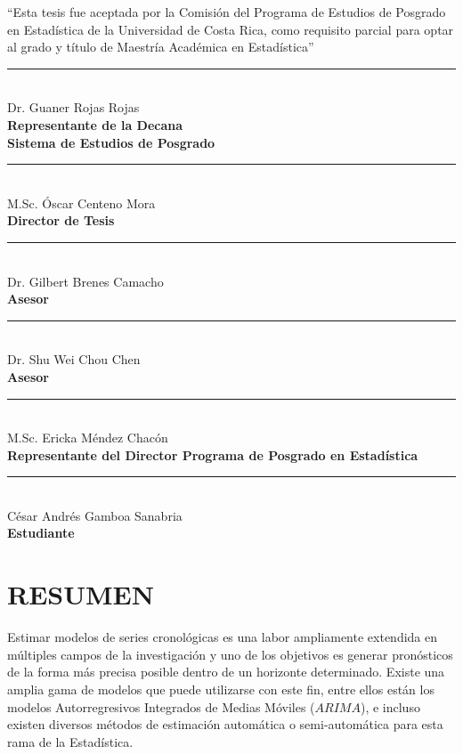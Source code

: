 \documentclass[
]{article}
\begin{document}
\begin{center}

``Esta tesis fue aceptada por la Comisión del Programa de Estudios de Posgrado en Estadística de la Universidad de Costa Rica, como requisito parcial para optar al grado y título de Maestría Académica en Estadística''

\text{}

\noindent\rule{7cm}{0.4pt}\\
Dr. Guaner Rojas Rojas\\
\textbf{Representante de la Decana}\\
\textbf{Sistema de Estudios de Posgrado}

\text{}

\noindent\rule{7cm}{0.4pt}\\
M.Sc. Óscar Centeno Mora\\
\textbf{Director de Tesis}

\text{}

\noindent\rule{7cm}{0.4pt}\\
Dr. Gilbert Brenes Camacho\\
\textbf{Asesor}

\text{}

\noindent\rule{7cm}{0.4pt}\\
Dr. Shu Wei Chou Chen\\
\textbf{Asesor}

\text{}

\noindent\rule{7cm}{0.4pt}\\
M.Sc. Ericka Méndez Chacón\\
\textbf{Representante del Director Programa de Posgrado en Estadística}

\text{}

\noindent\rule{7cm}{0.4pt}\\
César Andrés Gamboa Sanabria\\
\textbf{Estudiante}

\end{center}

\cleardoublepage

\tableofcontents

\cleardoublepage

\section*{RESUMEN}

Estimar modelos de series cronológicas es una labor ampliamente
extendida en múltiples campos de la investigación y uno de los objetivos
es generar pronósticos de la forma más precisa posible dentro de un
horizonte determinado. Existe una amplia gama de modelos que puede
utilizarse con este fin, entre ellos están los modelos Autorregresivos
Integrados de Medias Móviles (\(ARIMA\)), e incluso existen diversos
métodos de estimación automática o semi-automática para esta rama de la
Estadística.
\end{document}
